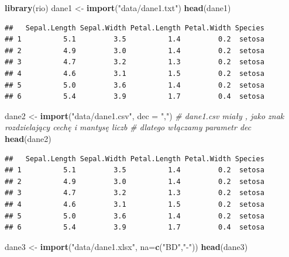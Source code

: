 \documentclass[]{book}
\newenvironment{Shaded}{\begin{snugshade}}{\end{snugshade}}
\newcommand{\CommentTok}[1]{\textcolor[rgb]{0.56,0.35,0.01}{\textit{#1}}}
\newcommand{\DataTypeTok}[1]{\textcolor[rgb]{0.13,0.29,0.53}{#1}}
\newcommand{\KeywordTok}[1]{\textcolor[rgb]{0.13,0.29,0.53}{\textbf{#1}}}
\newcommand{\NormalTok}[1]{#1}
\newcommand{\StringTok}[1]{\textcolor[rgb]{0.31,0.60,0.02}{#1}}
\theoremstyle{plain}
\theoremstyle{definition}
\theoremstyle{definition}
\theoremstyle{definition}
\theoremstyle{definition}
\theoremstyle{remark}
\begin{document}
\begin{Shaded}
\begin{Highlighting}[]
\KeywordTok{library}\NormalTok{(rio)}
\NormalTok{dane1 <-}\StringTok{ }\KeywordTok{import}\NormalTok{(}\StringTok{"data/dane1.txt"}\NormalTok{)}
\KeywordTok{head}\NormalTok{(dane1)}
\end{Highlighting}
\end{Shaded}

\begin{verbatim}
##   Sepal.Length Sepal.Width Petal.Length Petal.Width Species
## 1          5.1         3.5          1.4         0.2  setosa
## 2          4.9         3.0          1.4         0.2  setosa
## 3          4.7         3.2          1.3         0.2  setosa
## 4          4.6         3.1          1.5         0.2  setosa
## 5          5.0         3.6          1.4         0.2  setosa
## 6          5.4         3.9          1.7         0.4  setosa
\end{verbatim}

\begin{Shaded}
\begin{Highlighting}[]
\NormalTok{dane2 <-}\StringTok{ }\KeywordTok{import}\NormalTok{(}\StringTok{"data/dane1.csv"}\NormalTok{, }\DataTypeTok{dec =} \StringTok{","}\NormalTok{)}
\CommentTok{# dane1.csv miały , jako znak rozdzielający cechę i mantysę liczb}
\CommentTok{# dlatego włączamy parametr dec}
\KeywordTok{head}\NormalTok{(dane2)}
\end{Highlighting}
\end{Shaded}

\begin{verbatim}
##   Sepal.Length Sepal.Width Petal.Length Petal.Width Species
## 1          5.1         3.5          1.4         0.2  setosa
## 2          4.9         3.0          1.4         0.2  setosa
## 3          4.7         3.2          1.3         0.2  setosa
## 4          4.6         3.1          1.5         0.2  setosa
## 5          5.0         3.6          1.4         0.2  setosa
## 6          5.4         3.9          1.7         0.4  setosa
\end{verbatim}

\begin{Shaded}
\begin{Highlighting}[]
\NormalTok{dane3 <-}\StringTok{ }\KeywordTok{import}\NormalTok{(}\StringTok{"data/dane1.xlsx"}\NormalTok{, }\DataTypeTok{na=}\KeywordTok{c}\NormalTok{(}\StringTok{"BD"}\NormalTok{,}\StringTok{"-"}\NormalTok{))}
\KeywordTok{head}\NormalTok{(dane3)}
\end{Highlighting}
\end{Shaded}
\end{document}
